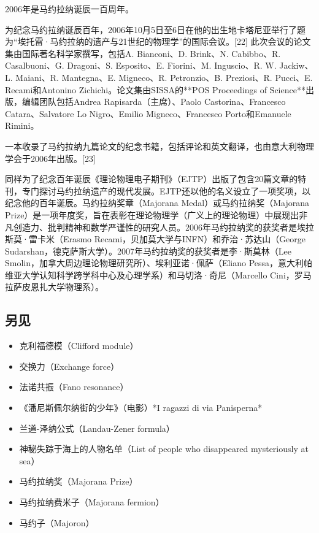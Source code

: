2006年是马约拉纳诞辰一百周年。

为纪念马约拉纳诞辰百年，2006年10月5日至6日在他的出生地卡塔尼亚举行了题为“埃托雷·马约拉纳的遗产与21世纪的物理学”的国际会议。[22] 此次会议的论文集由国际著名科学家撰写，包括A. Bianconi、D. Brink、N. Cabibbo、R. Casalbuoni、G. Dragoni、S. Esposito、E. Fiorini、M. Inguscio、R. W. Jackiw、L. Maiani、R. Mantegna、E. Migneco、R. Petronzio、B. Preziosi、R. Pucci、E. Recami和Antonino Zichichi。论文集由SISSA的**POS Proceedings of Science**出版，编辑团队包括Andrea Rapisarda（主席）、Paolo Castorina、Francesco Catara、Salvatore Lo Nigro、Emilio Migneco、Francesco Porto和Emanuele Rimini。

一本收录了马约拉纳九篇论文的纪念书籍，包括评论和英文翻译，也由意大利物理学会于2006年出版。[23]

同样为了纪念百年诞辰《理论物理电子期刊》（EJTP）出版了包含20篇文章的特刊，专门探讨马约拉纳遗产的现代发展。EJTP还以他的名义设立了一项奖项，以纪念他的百年诞辰。马约拉纳奖章（Majorana Medal）或马约拉纳奖（Majorana Prize）是一项年度奖，旨在表彰在理论物理学（广义上的理论物理）中展现出非凡创造力、批判精神和数学严谨性的研究人员。2006年马约拉纳奖的获奖者是埃拉斯莫·雷卡米（Erasmo Recami，贝加莫大学与INFN）和乔治·苏达山（George Sudarshan，德克萨斯大学）。2007年马约拉纳奖的获奖者是李·斯莫林（Lee Smolin，加拿大周边理论物理研究所）、埃利亚诺·佩萨（Eliano Pessa，意大利帕维亚大学认知科学跨学科中心及心理学系）和马切洛·奇尼（Marcello Cini，罗马拉萨皮恩扎大学物理系）。
\subsection{另见}
\begin{itemize}
\item 克利福德模（Clifford module）  
\item 交换力（Exchange force）  
\item 法诺共振（Fano resonance）  
\item 《潘尼斯佩尔纳街的少年》（电影）*I ragazzi di via Panisperna*  
\item 兰道-泽纳公式（Landau-Zener formula）  
\item 神秘失踪于海上的人物名单（List of people who disappeared mysteriously at sea）  
\item 马约拉纳奖（Majorana Prize）  
\item 马约拉纳费米子（Majorana fermion）  
\item 马约子（Majoron）
\end{itemize}
